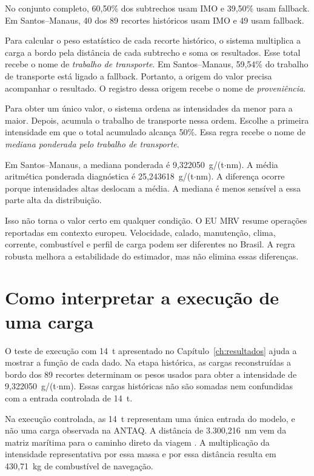 No conjunto completo, 60,50\% dos subtrechos usam IMO e 39,50\% usam fallback. Em Santos--Manaus, 40 dos 89 recortes históricos usam IMO e 49 usam fallback.

Para calcular o peso estatístico de cada recorte histórico, o sistema multiplica a carga a bordo pela distância de cada subtrecho e soma os resultados. Esse total recebe o nome de \emph{trabalho de transporte}. Em Santos--Manaus, 59,54\% do trabalho de transporte está ligado a fallback. Portanto, a origem do valor precisa acompanhar o resultado. O registro dessa origem recebe o nome de \emph{proveniência}.

Para obter um único valor, o sistema ordena as intensidades da menor para a maior. Depois, acumula o trabalho de transporte nessa ordem. Escolhe a primeira intensidade em que o total acumulado alcança 50\%. Essa regra recebe o nome de \emph{mediana ponderada pelo trabalho de transporte}.

Em Santos--Manaus, a mediana ponderada é 9,322050~g/(t$\cdot$nm). A média aritmética ponderada diagnóstica é 25,243618~g/(t$\cdot$nm). A diferença ocorre porque intensidades altas deslocam a média. A mediana é menos sensível a essa parte alta da distribuição.

Isso não torna o valor certo em qualquer condição. O EU MRV resume operações reportadas em contexto europeu. Velocidade, calado, manutenção, clima, corrente, combustível e perfil de carga podem ser diferentes no Brasil. A regra robusta melhora a estabilidade do estimador, mas não elimina essas diferenças.

\section{Como interpretar a execução de uma carga}
\label{sec:porta-a-porta-discussao}

O teste de execução com 14~t apresentado no Capítulo~\ref{ch:resultados} ajuda a mostrar a função de cada dado. Na etapa histórica, as cargas reconstruídas a bordo dos 89 recortes determinam os pesos usados para obter a intensidade de 9,322050~g/(t$\cdot$nm). Essas cargas históricas não são somadas nem confundidas com a entrada controlada de 14~t.

Na execução controlada, as 14~t representam uma única entrada do modelo, e não uma carga observada na ANTAQ. A distância de 3.300,216~nm vem da matriz marítima para o caminho direto da viagem . A multiplicação da intensidade representativa por essa massa e por essa distância resulta em 430,71~kg de combustível de navegação.

